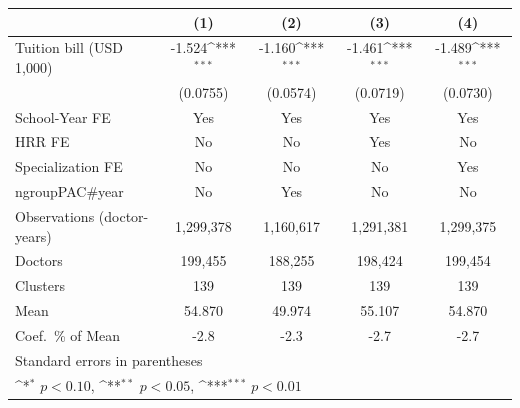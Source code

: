 {
\def\sym#1{\ifmmode^{#1}\else\(^{#1}\)\fi}
\begin{tabular}{l*{4}{c}}
\hline\hline
                    &\multicolumn{1}{c}{(1)}         &\multicolumn{1}{c}{(2)}         &\multicolumn{1}{c}{(3)}         &\multicolumn{1}{c}{(4)}         \\
\hline
Tuition bill (USD 1,000)&      -1.524\sym{***}&      -1.160\sym{***}&      -1.461\sym{***}&      -1.489\sym{***}\\
                    &    (0.0755)         &    (0.0574)         &    (0.0719)         &    (0.0730)         \\
[1em]
School-Year FE      &         Yes         &         Yes         &         Yes         &         Yes         \\
[1em]
HRR FE              &          No         &          No         &         Yes         &          No         \\
[1em]
Specialization FE   &          No         &          No         &          No         &         Yes         \\
[1em]
ngroupPAC#year      &          No         &         Yes         &          No         &          No         \\
\hline
Observations (doctor-years)&   1,299,378         &   1,160,617         &   1,291,381         &   1,299,375         \\
Doctors             &     199,455         &     188,255         &     198,424         &     199,454         \\
Clusters            &         139         &         139         &         139         &         139         \\
Mean                &      54.870         &      49.974         &      55.107         &      54.870         \\
Coef.\ \% of Mean   &        -2.8         &        -2.3         &        -2.7         &        -2.7         \\
\hline\hline
\multicolumn{5}{l}{\footnotesize Standard errors in parentheses}\\
\multicolumn{5}{l}{\footnotesize \sym{*} \(p<0.10\), \sym{**} \(p<0.05\), \sym{***} \(p<0.01\)}\\
\end{tabular}
}
